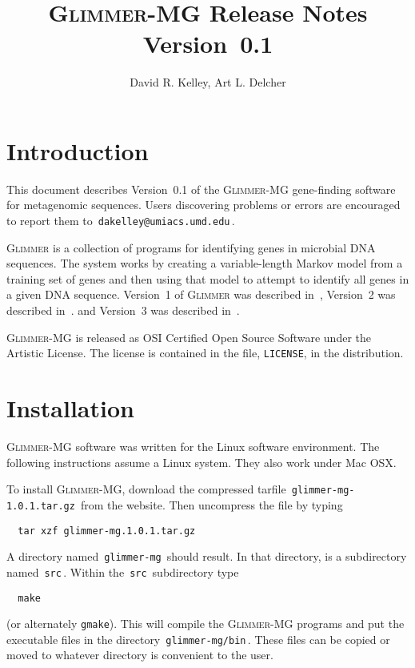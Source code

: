 \documentclass[fleqn,titlepage,11pt]{article}
\def\Glimmer{\textsc{Glimmer}}
\def\Gmg{\textsc{Glimmer-MG}}
\def\Pg#1{\texttt{#1}}
\begin{document}
\RaggedRight
\sloppy

\title{\Gmg{} Release Notes \\ Version~0.1}
\author{David R. Kelley, Art L. Delcher}

\maketitle

\section{Introduction}

This document describes Version~0.1 of the \Gmg{} gene-finding
software for metagenomic sequences.  Users discovering problems or
errors are encouraged to report them to
\,\verb`dakelley@umiacs.umd.edu`\,.

\Glimmer{} is a collection of programs for identifying genes in
microbial DNA sequences.  The system works by creating a
variable-length Markov model from a training set of genes and then
using that model to attempt to identify all genes in a given DNA
sequence.  Version~1 of \Glimmer{} was described in~\cite{glimmer1},
Version~2 was described in~\cite{glimmer2}. and Version~3 was
described in~\cite{glimmer3}.

\Gmg{} is released as OSI Certified Open Source Software under the
Artistic License.  The license is contained in the file, \Pg{LICENSE},
in the distribution.

\section{Installation}

\Gmg{} software was written for the Linux software environment.  The
following instructions assume a Linux system.  They also work under
Mac OSX.

To install \Gmg{}, download the compressed tarfile
\,\verb`glimmer-mg-1.0.1.tar.gz`\,
from the website.  Then uncompress the file by typing
\BSV\begin{verbatim}
  tar xzf glimmer-mg.1.0.1.tar.gz
\end{verbatim}\ESV
A directory named \,\verb`glimmer-mg`\, should result.
In that directory, is a subdirectory named \,\verb`src`\,.
Within the \,\verb`src`\, subdirectory type
\BSV\begin{verbatim}
  make
\end{verbatim}\ESV
(or alternately \Pg{gmake}).
This will compile the \Gmg{} programs
and put the executable files in the directory
\,\verb`glimmer-mg/bin`\,.  These files can be copied or moved to
whatever directory is convenient to the user.
\end{document}
